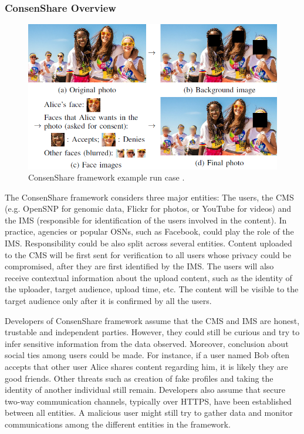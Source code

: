 \documentclass[conference, 11pt]{IEEEtran}
\begin{document}
\subsubsection{ConsenShare Overview}
\begin{figure}[t]
\centerline{\includegraphics[width=.5\textwidth]{img/consen_example.png}}
\caption{ConsenShare framework example run case \cite{olteanu2018consensual}.}
\label{fig:consen}
\end{figure}
The ConsenShare framework \cite{olteanu2018consensual} considers three major entities: The users, the \ac{CMS} (e.g. OpenSNP for genomic data, Flickr for photos, or YouTube for videos) and the \ac{IMS} (responsible for identification of the users involved in the content). In practice, agencies or popular OSNs, such as Facebook, could play the role of the \ac{IMS}. Responsibility could be also split across several entities. Content uploaded to the CMS will be first sent for verification to all users whose privacy could be compromised, after they are first identified by the \ac{IMS}. The users will also receive contextual information about the upload content, such as the identity of the uploader, target audience, upload time, etc. The content will be visible to the target audience only after it is confirmed by all the users. 

Developers of ConsenShare framework assume that the \ac{CMS} and \ac{IMS} are honest, trustable and independent parties. However, they could still be curious and try to infer sensitive information from the data observed. Moreover, conclusion about social ties among users could be made. For instance, if a user named Bob often accepts that other user Alice shares content regarding him, it is likely they are good friends. Other threats such as creation of fake profiles and taking the identity of another individual still remain. Developers also assume that secure two-way communication channels, typically over HTTPS, have been established between all entities. A malicious user might still try to gather data and monitor communications among the different entities in the framework. 
\end{document}
